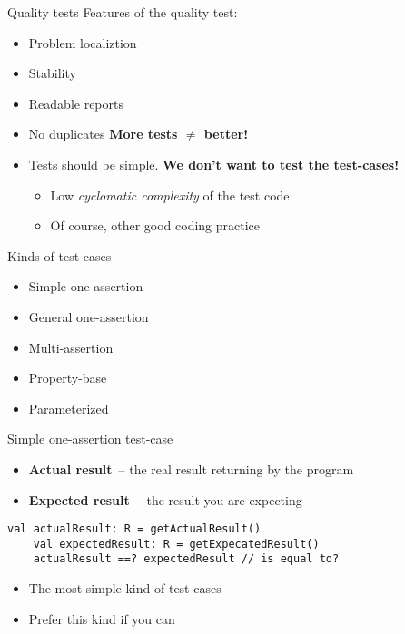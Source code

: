 \documentclass[aspectratio=169]{beamer}
\begin{document}
\begin{frame}{Quality tests}
  Features of the quality test:
  \begin{itemize}
    \item Problem localiztion
    \item Stability
    \item Readable reports
    \item No duplicates \textbf{More tests $\ne$ better!}
    \item Tests should be simple. \textbf{We don't want to test the test-cases!}
    \pause
      \begin{itemize}
        \item Low \textit{cyclomatic complexity} of the test code
        \item Of course, other good coding practice
      \end{itemize}
  \end{itemize}
\end{frame}

\begin{frame}{Kinds of test-cases}
  \begin{itemize}
    \item Simple one-assertion
    \item General one-assertion
    \item Multi-assertion
    \item Property-base
    \item Parameterized
  \end{itemize}
\end{frame}

\begin{frame}[fragile]{Simple one-assertion test-case}
  \begin{itemize}
    \item \textbf{Actual result}~-- the real result returning by the program
    \item \textbf{Expected result}~-- the result you are expecting
  \end{itemize}
  \begin{lstlisting}[style=scala]
    val actualResult: R = getActualResult()
    val expectedResult: R = getExpecatedResult()
    actualResult ==? expectedResult // is equal to?
  \end{lstlisting}
  \begin{itemize}
    \item The most simple kind of test-cases
    \item Prefer this kind if you can
  \end{itemize}
\end{frame}
\end{document}
